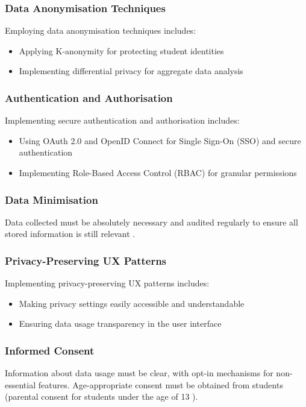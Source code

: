 \documentclass[14pt,a4paper]{article}
\begin{document}
\begin{multicols}{2}

\subsubsection*{Data Anonymisation Techniques}
Employing data anonymisation techniques \textit{\parencite[pp. 75-100]{ElEmamArbuckle2023}} includes:
\begin{itemize}
    \item Applying K-anonymity for protecting student identities
    \item Implementing differential privacy for aggregate data analysis
\end{itemize}

\subsubsection*{Authentication and Authorisation}
Implementing secure authentication and authorisation \textit{\parencite[pp. 80-120]{Josuttis2023}} includes:
\begin{itemize}
    \item Using OAuth 2.0 and OpenID Connect for Single Sign-On (SSO) and secure authentication
    \item Implementing Role-Based Access Control (RBAC) for granular permissions
\end{itemize}

\subsubsection{Data Minimisation}
Data collected must be absolutely necessary and audited regularly to ensure all stored information is still relevant \textit{\parencite{A29WP2018}}.

\subsubsection*{Privacy-Preserving UX Patterns}
Implementing privacy-preserving UX patterns \textit{\parencite[pp. 50-100]{Hartzog2023}} includes:
\begin{itemize}
    \item Making privacy settings easily accessible and understandable
    \item Ensuring data usage transparency in the user interface
\end{itemize}

\subsubsection*{Informed Consent}
Information about data usage must be clear, with opt-in mechanisms for non-essential features. Age-appropriate consent must be obtained from students (parental consent for students under the age of 13 \textit{\parencite{FTC2023}}).



\end{multicols}
\end{document}
